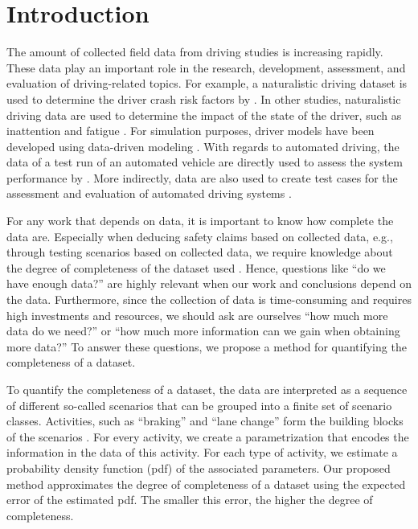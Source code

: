\section{Introduction}
\label{sec:introduction}

The amount of collected field data from driving studies is increasing rapidly. These data play an important role in the research, development, assessment, and evaluation of driving-related topics. For example, a naturalistic driving dataset is used to determine the driver crash risk factors by \textcite{dingus2016crashrisk}. In other studies, naturalistic driving data are used to determine the impact of the state of the driver, such as inattention \cite{klauer2006impact} and fatigue \cite{williamson2011link}. For simulation purposes, driver models have been developed using data-driven modeling \cite{sadigh2014data}. With regards to automated driving, the data of a test run of an automated vehicle are directly used to assess the system performance by \textcite{broggi2013extensive}. More indirectly, data are also used to create test cases for the assessment and evaluation of automated driving systems \cite{zofka2015datadrivetrafficscenarios, elrofai2018scenario, deGelder2017assessment, ploeg2018cetran, putz2017pegasus, krajewski2018highD}.

For any work that depends on data, it is important to know how complete the data are. Especially when deducing safety claims based on collected data, e.g., through testing scenarios based on collected data, we require knowledge about the degree of completeness of the dataset used \cite{geyer2014, stellet2015taxonomy, alvarez2017prospective}. Hence, questions like ``do we have enough data?'' are highly relevant when our work and conclusions depend on the data. Furthermore, since the collection of data is time-consuming and requires high investments and resources, we should ask are ourselves ``how much more data do we need?'' or ``how much more information can we gain when obtaining more data?'' To answer these questions, we propose a method for quantifying the completeness of a dataset. 

To quantify the completeness of a dataset, the data are interpreted as a sequence of different so-called scenarios that can be grouped into a finite set of scenario classes. Activities, such as ``braking'' and ``lane change'' form the building blocks of the scenarios \cite{elrofai2018scenario}. For every activity, we create a parametrization that encodes the information in the data of this activity. For each type of activity, we estimate a probability density function (pdf) of the associated parameters. Our proposed method approximates the degree of completeness of a dataset using the expected error of the estimated pdf. The smaller this error, the higher the degree of completeness.


